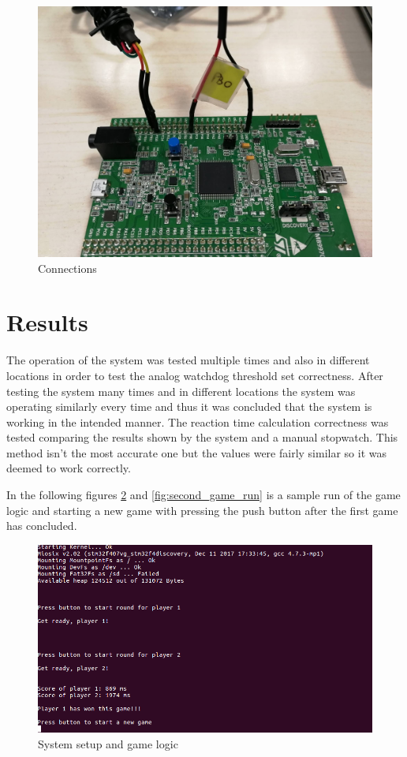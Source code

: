\begin{figure}[htbp]
  \centering
     \includegraphics[width=1\textwidth]{./figures/connections.jpg}
  \caption{Connections}
  \label{fig:connections}
\end{figure}

\pagebreak

\section{Results} \label{Results}
The operation of the system was tested multiple times and also in different locations in order to test the analog watchdog threshold set correctness. After testing the system many times and in different locations the system was operating similarly every time and thus it was concluded that the system is working in the intended manner. The reaction time calculation correctness was tested comparing the results shown by the system and a manual stopwatch. This method isn't the most accurate one but the values were fairly similar so it was deemed to work correctly.\\
\par In the following figures \ref{fig:first_game_run} and \ref{fig:second_game_run} is a sample run of the game logic and starting a new game with pressing the push button after the first game has concluded.

\begin{figure}[htbp]
  \centering
     \includegraphics[width=1\textwidth]{./figures/Game_demo4.png}
  \caption{System setup and game logic}
  \label{fig:first_game_run}
\end{figure}

